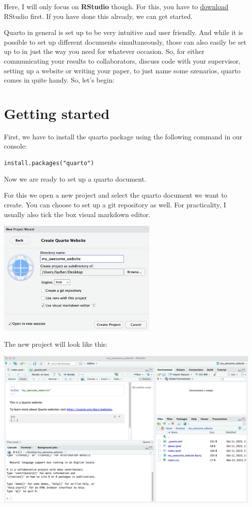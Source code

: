 \documentclass[
  letterpaper,
  DIV=11,
  numbers=noendperiod]{scrreprt}
\begin{document}
Here, I will only focus on \textbf{RStudio} though. For this, you have
to \href{https://posit.co/download/rstudio-desktop/}{download} RStudio
first. If you have done this already, we can get started.

Quarto in general is set up to be very intuitive and user friendly. And
while it is possible to set up different documents simultaneously, those
can also easily be set up to in just the way you need for whatever
occasion. So, for either communicating your results to collaborators,
discuss code with your supervisor, setting up a website or writing your
paper, to just name some szenarios, quarto comes in quite handy. So,
let's begin:

\hypertarget{getting-started}{%
\section{Getting started}\label{getting-started}}

First, we have to install the quarto package using the following command
in our console:

\texttt{install.packages("quarto")}

Now we are ready to set up a quarto document.

For this we open a new project and select the quarto document we want to
create. You can choose to set up a git repository as well. For
practicality, I usually also tick the box visual markdown editor.

\includegraphics[width=3.125in,height=\textheight]{img/quarto_intro/Screenshot 2023-10-11 at 11.34.16.png}

The new project will look like this:

\includegraphics{img/quarto_intro/Screenshot 2023-10-11 at 11.39.43.png}
\end{document}
